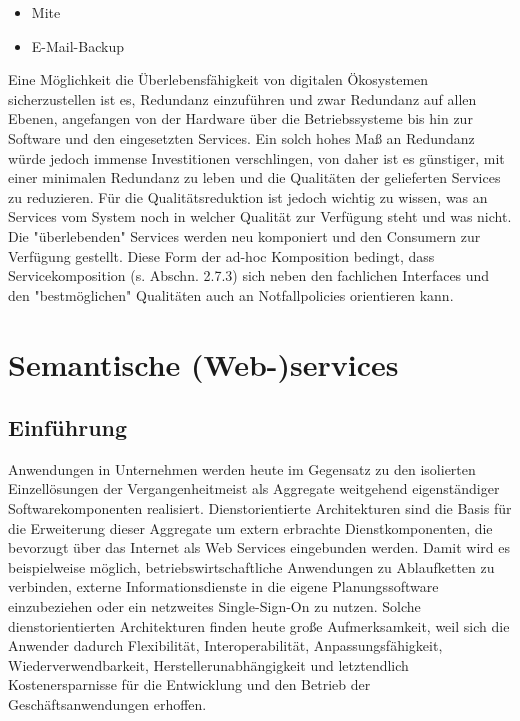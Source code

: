 \documentclass[10pt,a4paper]{article}
\begin{document}

\begin{itemize}
\item Mite
\item E-Mail-Backup
\end{itemize}


Eine Möglichkeit die Überlebensfähigkeit von digitalen Ökosystemen sicherzustellen
ist es, Redundanz einzuführen und zwar Redundanz auf allen Ebenen, angefangen
von der Hardware über die Betriebssysteme bis hin zur Software und den
eingesetzten Services. Ein solch hohes Maß an Redundanz würde jedoch immense
Investitionen verschlingen, von daher ist es günstiger, mit einer minimalen Redundanz
zu leben und die Qualitäten der gelieferten Services zu reduzieren. Für die
Qualitätsreduktion ist jedoch wichtig zu wissen, was an Services vom System noch
in welcher Qualität zur Verfügung steht und was nicht. Die "überlebenden" Services
werden neu komponiert und den Consumern zur Verfügung gestellt. Diese Form der
ad-hoc Komposition bedingt, dass Servicekomposition (s. Abschn. 2.7.3) sich neben
den fachlichen Interfaces und den "bestmöglichen" Qualitäten auch an Notfallpolicies
orientieren kann. \cite{mkulss}

\section{Semantische (Web-)services}
\label{l:sem-web-ser}
\subsection{Einführung}

Anwendungen in Unternehmen werden heute im Gegensatz zu den isolierten Einzellösungen
der Vergangenheitmeist als Aggregate weitgehend eigenständiger Softwarekomponenten realisiert.
Dienstorientierte Architekturen sind die Basis für die Erweiterung dieser Aggregate um
extern erbrachte Dienstkomponenten, die bevorzugt über das Internet als Web Services eingebunden
werden. Damit wird es beispielweise möglich, betriebswirtschaftliche Anwendungen zu
Ablaufketten zu verbinden, externe Informationsdienste in die eigene Planungssoftware einzubeziehen
oder ein netzweites Single-Sign-On zu nutzen. Solche dienstorientierten Architekturen
finden heute große Aufmerksamkeit, weil sich die Anwender dadurch Flexibilität, Interoperabilität,
Anpassungsfähigkeit, Wiederverwendbarkeit, Herstellerunabhängigkeit und letztendlich
Kostenersparnisse für die Entwicklung und den Betrieb der Geschäftsanwendungen erhoffen. \cite{addo}
\end{document}
